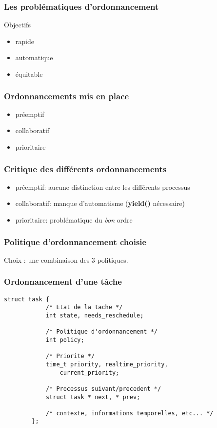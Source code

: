 \documentclass{beamer}
\begin{document}
\begin{frame}
    \frametitle{Les problématiques d'ordonnancement}
    \begin{center}
        \huge Objectifs
    \end{center}
    \begin{itemize}
        \item<2-> rapide
        \item<3-> automatique
        \item<4-> équitable
    \end{itemize}
\end{frame}

\begin{frame}
    \frametitle{Ordonnancements mis en place}
    \begin{itemize}
        \item<2-> préemptif
        \item<3-> collaboratif
        \item<4-> prioritaire
    \end{itemize}
\end{frame}

\begin{frame}
    \frametitle{Critique des différents ordonnancements}
    \begin{itemize}
        \item préemptif: aucune distinction entre les différents processus
        \item collaboratif: manque d'automatisme (\textbf{yield()} nécessaire)
        \item prioritaire: problématique du \emph{bon} ordre
    \end{itemize}
\end{frame}

\begin{frame}
    \frametitle{Politique d'ordonnancement choisie}
    \begin{center}
        \huge Choix : une combinaison des 3 politiques.
    \end{center}
\end{frame}

\begin{frame}[fragile]
    \frametitle{Ordonnancement d'une tâche}
    \begin{lstlisting}[caption=Représentation structurelle d'un processus]
        struct task {
            /* Etat de la tache */
            int state, needs_reschedule;

            /* Politique d'ordonnancement */
            int policy;

            /* Priorite */
            time_t priority, realtime_priority,
                current_priority;

            /* Processus suivant/precedent */
            struct task * next, * prev;

            /* contexte, informations temporelles, etc... */
        };
    \end{lstlisting}
\end{frame}
\end{document}
